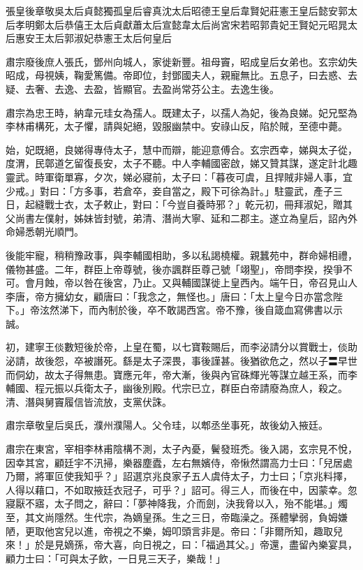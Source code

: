 
\begin{pinyinscope}

 張皇後章敬吳太后貞懿獨孤皇后睿真沈太后昭德王皇后韋賢妃莊憲王皇后懿安郭太后孝明鄭太后恭僖王太后貞獻蕭太后宣懿韋太后尚宮宋若昭郭貴妃王賢妃元昭晁太后惠安王太后郭淑妃恭憲王太后何皇后



 肅宗廢後庶人張氏，鄧州向城人，家徙新豐。祖母竇，昭成皇后女弟也。玄宗幼失昭成，母視姨，鞠愛篤備。帝即位，封鄧國夫人，親寵無比。五息子，曰去惑、去疑、去奢、去逸、去盈，皆顯官。去盈尚常芬公主。去逸生後。



 肅宗為忠王時，納韋元珪女為孺人。既建太子，以孺人為妃，後為良娣。妃兄堅為李林甫構死，太子懼，請與妃絕，毀服幽禁中。安祿山反，陷於賊，至德中薨。



 始，妃既絕，良娣得專侍太子，慧中而辯，能迎意傅合。玄宗西幸，娣與太子從，度渭，民鄣道乞留復長安，太子不聽。中人李輔國密啟，娣又贊其謀，遂定計北趣靈武。時軍衛單寡，夕次，娣必寢前，太子曰：「暮夜可虞，且捍賊非婦人事，宜少戒。」對曰：「方多事，若倉卒，妾自當之，殿下可徐為計。」駐靈武，產子三日，起縫戰士衣，太子敕止，對曰：「今豈自養時邪？」乾元初，冊拜淑妃，贈其父尚書左僕射，姊妹皆封號，弟清、潛尚大寧、延和二郡主。遂立為皇后，詔內外命婦悉朝光順門。



 後能牢寵，稍稍豫政事，與李輔國相助，多以私謁橈權。親蠶苑中，群命婦相禮，儀物甚盛。二年，群臣上帝尊號，後亦諷群臣尊己號「翊聖」，帝問李揆，揆爭不可。會月蝕，帝以咎在後宮，乃止。又與輔國謀徙上皇西內。端午日，帝召見山人李唐，帝方擁幼女，顧唐曰：「我念之，無怪也。」唐曰：「太上皇今日亦當念陛下。」帝泫然涕下，而內制於後，卒不敢謁西宮。帝不豫，後自箴血寫佛書以示誠。



 初，建寧王倓數短後於帝，上皇在蜀，以七寶鞍賜后，而李泌請分以賞戰士，倓助泌請，故後怨，卒被譖死。繇是太子深畏，事後謹甚。後猶欲危之，然以子〓早世而侗幼，故太子得無患。寶應元年，帝大漸，後與內官硃輝光等謀立越王系，而李輔國、程元振以兵衛太子，幽後別殿。代宗已立，群臣白帝請廢為庶人，殺之。清、潛與舅竇履信皆流放，支黨伏誅。



 肅宗章敬皇后吳氏，濮州濮陽人。父令珪，以郫丞坐事死，故後幼入掖廷。



 肅宗在東宮，宰相李林甫陰構不測，太子內憂，鬢發班禿。後入謁，玄宗見不悅，因幸其宮，顧廷宇不汛掃，樂器塵蠹，左右無嬪侍，帝愀然謂高力士曰：「兒居處乃爾，將軍叵使我知乎？」詔選京兆良家子五人虞侍太子，力士曰；「京兆料擇，人得以藉口，不如取掖廷衣冠子，可乎？」詔可。得三人，而後在中，因蒙幸。忽寢厭不寤，太子問之，辭曰：「夢神降我，介而劍，決我脅以入，殆不能堪。」燭至，其文尚隱然。生代宗，為嫡皇孫。生之三日，帝臨澡之。孫體攣弱，負姆嫌陋，更取他宮兒以進，帝視之不樂，姆叩頭言非是。帝曰：「非爾所知，趣取兒來！」於是見嫡孫，帝大喜，向日視之，曰：「福過其父。」帝還，盡留內樂宴具，顧力士曰：「可與太子飲，一日見三天子，樂哉！」




\end{pinyinscope}
